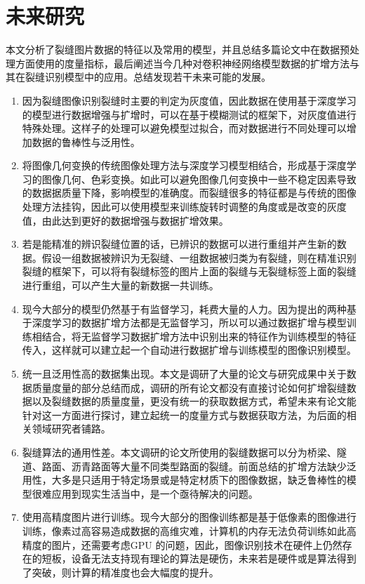 \documentclass[a4paper,UTF8]{article}
\theoremstyle{definition}
\begin{document}
    \section{未来研究}
    本文分析了裂缝图片数据的特征以及常用的模型，并且总结多篇论文中在数据预处理方面使用的度量指标，最后阐述当今几种对卷积神经网络模型数据的扩增方法与其在裂缝识别模型中的应用。总结发现若干未来可能的发展。
    \begin{enumerate}[(1)]
    	\item 因为裂缝图像识别裂缝时主要的判定为灰度值，因此数据在使用基于深度学习的模型进行数据增强与扩增时，可以在基于模糊测试的框架下，对灰度值进行特殊处理。这样子的处理可以避免模型过拟合，而对数据进行不同处理可以增加数据的鲁棒性与泛用性。
    	\item 将图像几何变换的传统图像处理方法与深度学习模型相结合，形成基于深度学习的图像几何、色彩变换。如此可以避免图像几何变换中一些不稳定因素导致的数据据质量下降，影响模型的准确度。而裂缝很多的特征都是与传统的图像处理方法挂钩，因此可以使用模型来训练旋转时调整的角度或是改变的灰度值，由此达到更好的数据增强与数据扩增效果。
    	\item 若是能精准的辨识裂缝位置的话，已辨识的数据可以进行重组并产生新的数据。假设一组数据被辨识为无裂缝、一组数据被归类为有裂缝，则在精准识别裂缝的框架下，可以将有裂缝标签的图片上面的裂缝与无裂缝标签上面的裂缝进行重组，可以产生大量的新数据一共训练。
    	\item 现今大部分的模型仍然基于有监督学习，耗费大量的人力。因为提出的两种基于深度学习的数据扩增方法都是无监督学习，所以可以通过数据扩增与模型训练相结合，将无监督学习数据扩增方法中识别出来的特征作为训练模型的特征传入，这样就可以建立起一个自动进行数据扩增与训练模型的图像识别模型。
    	\item 统一且泛用性高的数据集出现。本文是调研了大量的论文与研究成果中关于数据质量度量的部分总结而成，调研的所有论文都没有直接讨论如何扩增裂缝数据以及裂缝数据的质量度量，更没有统一的获取数据方式，希望未来有论文能针对这一方面进行探讨，建立起统一的度量方式与数据获取方法，为后面的相关领域研究者铺路。
    	\item 裂缝算法的通用性差。本文调研的论文所使用的裂缝数据可以分为桥梁、隧道、路面、沥青路面等大量不同类型路面的裂缝。前面总结的扩增方法缺少泛用性，大多是只适用于特定场景或是特定材质下的图像数据，缺乏鲁棒性的模型很难应用到现实生活当中，是一个亟待解决的问题。
    	\item 使用高精度图片进行训练。现今大部分的图像训练都是基于低像素的图像进行训练，像素过高容易造成数据的高维灾难，计算机的内存无法负荷训练如此高精度的图片，还需要考虑GPU 的问题，因此，图像识别技术在硬件上仍然存在的短板，设备无法支持现有理论的算法是硬伤，未来若是硬件或是算法得到了突破，则计算的精准度也会大幅度的提升。
    \end{enumerate}
\end{document}
